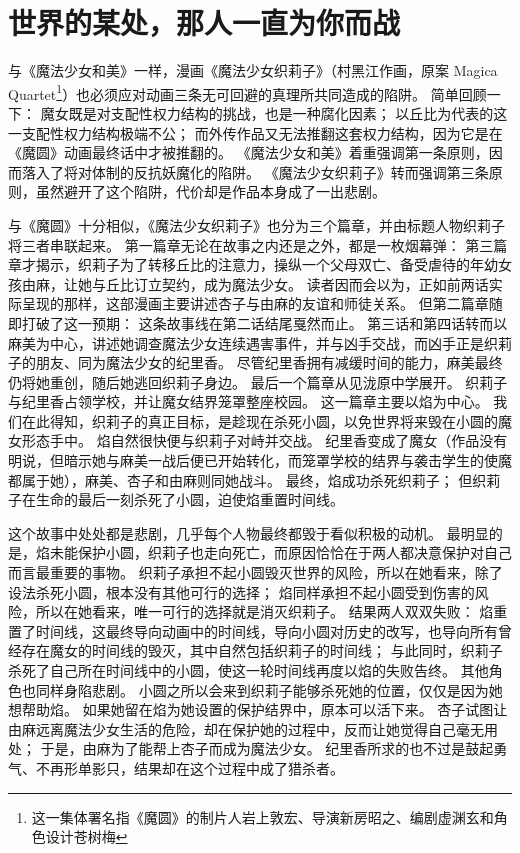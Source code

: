 \chapter[世界的某处，那人一直为你而战]{世界的某处，那人一直为你而战}


与《魔法少女和美》一样，漫画《魔法少女织莉子》（村黑江作画，原案 Magica Quartet\footnote{%
    这一集体署名指《魔圆》的制片人岩上敦宏、导演新房昭之、编剧虚渊玄和角色设计苍树梅
}）也必须应对动画三条无可回避的真理所共同造成的陷阱。
简单回顾一下：
魔女既是对支配性权力结构的挑战，也是一种腐化因素；
以丘比为代表的这一支配性权力结构极端不公；
而外传作品又无法推翻这套权力结构，因为它是在《魔圆》动画最终话中才被推翻的。
《魔法少女和美》着重强调第一条原则，因而落入了将对体制的反抗妖魔化的陷阱。
《魔法少女织莉子》转而强调第三条原则，虽然避开了这个陷阱，代价却是作品本身成了一出悲剧。

与《魔圆》十分相似，《魔法少女织莉子》也分为三个篇章，并由标题人物织莉子将三者串联起来。
第一篇章无论在故事之内还是之外，都是一枚烟幕弹：
第三篇章才揭示，织莉子为了转移丘比的注意力，操纵一个父母双亡、备受虐待的年幼女孩由麻，让她与丘比订立契约，成为魔法少女。
读者因而会以为，正如前两话实际呈现的那样，这部漫画主要讲述杏子与由麻的友谊和师徒关系。
但第二篇章随即打破了这一预期：
这条故事线在第二话结尾戛然而止。
第三话和第四话转而以麻美为中心，讲述她调查魔法少女连续遇害事件，并与凶手交战，而凶手正是织莉子的朋友、同为魔法少女的纪里香。
尽管纪里香拥有减缓时间的能力，麻美最终仍将她重创，随后她逃回织莉子身边。
最后一个篇章从见泷原中学展开。
织莉子与纪里香占领学校，并让魔女结界笼罩整座校园。
这一篇章主要以焰为中心。
我们在此得知，织莉子的真正目标，是趁现在杀死小圆，以免世界将来毁在小圆的魔女形态手中。
焰自然很快便与织莉子对峙并交战。
纪里香变成了魔女（作品没有明说，但暗示她与麻美一战后便已开始转化，而笼罩学校的结界与袭击学生的使魔都属于她），麻美、杏子和由麻则同她战斗。
最终，焰成功杀死织莉子；
但织莉子在生命的最后一刻杀死了小圆，迫使焰重置时间线。

这个故事中处处都是悲剧，几乎每个人物最终都毁于看似积极的动机。
最明显的是，焰未能保护小圆，织莉子也走向死亡，而原因恰恰在于两人都决意保护对自己而言最重要的事物。
织莉子承担不起小圆毁灭世界的风险，所以在她看来，除了设法杀死小圆，根本没有其他可行的选择；
焰同样承担不起小圆受到伤害的风险，所以在她看来，唯一可行的选择就是消灭织莉子。
结果两人双双失败：
焰重置了时间线，这最终导向动画中的时间线，导向小圆对历史的改写，也导向所有曾经存在魔女的时间线的毁灭，其中自然包括织莉子的时间线；
与此同时，织莉子杀死了自己所在时间线中的小圆，使这一轮时间线再度以焰的失败告终。
其他角色也同样身陷悲剧。
小圆之所以会来到织莉子能够杀死她的位置，仅仅是因为她想帮助焰。
如果她留在焰为她设置的保护结界中，原本可以活下来。
杏子试图让由麻远离魔法少女生活的危险，却在保护她的过程中，反而让她觉得自己毫无用处；
于是，由麻为了能帮上杏子而成为魔法少女。
纪里香所求的也不过是鼓起勇气、不再形单影只，结果却在这个过程中成了猎杀者。

